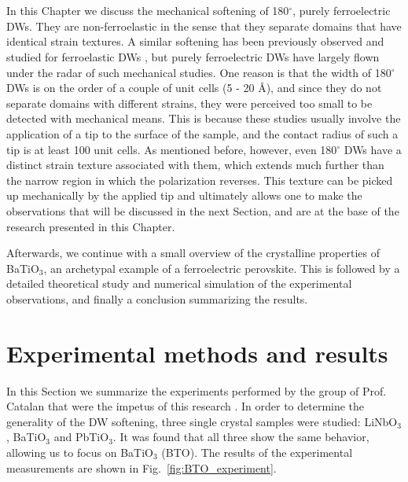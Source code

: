 \\\\
In this Chapter we discuss the mechanical softening of 180$^\circ$, purely ferroelectric DWs. They are non-ferroelastic in the sense that they separate domains that have identical strain textures.
A similar softening has been previously observed and studied for ferroelastic DWs \cite{Lee2003,Scott2012}, but purely ferroelectric DWs have largely flown under the radar of such mechanical studies.
One reason is that the width of 180$^\circ$ DWs is on the order of a couple of unit cells (5 - 20 \AA \cite{Zhirnov1959}), and since they do not separate domains with different strains, they were perceived too small to be detected with mechanical means.
This is because these studies usually involve the application of a tip to the surface of the sample, and the contact radius of such a tip is at least 100 unit cells.
As mentioned before, however, even 180$^\circ$ DWs have a distinct strain texture associated with them, which extends much further than the narrow region in which the polarization reverses.
This texture can be picked up mechanically by the applied tip and ultimately allows one to make the observations that will be discussed in the next Section, and are at the base of the research presented in this Chapter.

Afterwards, we continue with a small overview of the crystalline properties of BaTiO$_3$, an archetypal example of a ferroelectric perovskite.
This is followed by a detailed theoretical study and numerical simulation of the experimental observations, and finally a conclusion summarizing the results.

\section{Experimental methods and results}
In this Section we summarize the experiments performed by the group of Prof. Catalan that were the impetus of this research \cite{Stefani2020}.
In order to determine the generality of the DW softening, three single crystal samples were studied: LiNbO$_3$, BaTiO$_3$ and PbTiO$_3$. It was found that all three show the same behavior, allowing us to focus on BaTiO$_3$ (BTO).
The results of the experimental measurements are shown in Fig.~\ref{fig:BTO_experiment}.

